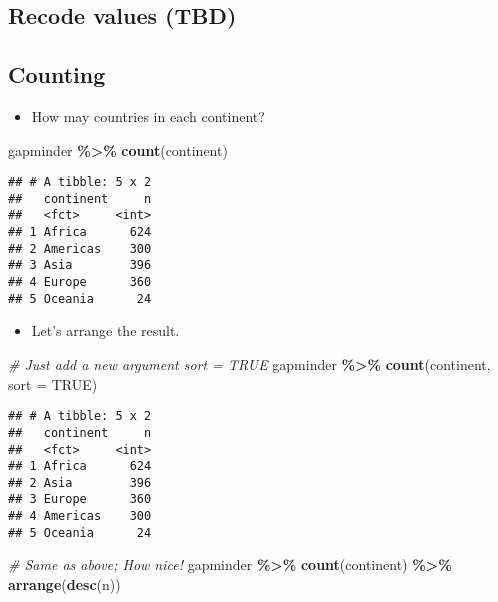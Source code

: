 \documentclass[
]{book}
\newenvironment{Shaded}{\begin{snugshade}}{\end{snugshade}}
\newcommand{\CommentTok}[1]{\textcolor[rgb]{0.56,0.35,0.01}{\textit{#1}}}
\newcommand{\DataTypeTok}[1]{\textcolor[rgb]{0.13,0.29,0.53}{#1}}
\newcommand{\KeywordTok}[1]{\textcolor[rgb]{0.13,0.29,0.53}{\textbf{#1}}}
\newcommand{\NormalTok}[1]{#1}
\newcommand{\OperatorTok}[1]{\textcolor[rgb]{0.81,0.36,0.00}{\textbf{#1}}}
\newcommand{\OtherTok}[1]{\textcolor[rgb]{0.56,0.35,0.01}{#1}}
\newcommand{\StringTok}[1]{\textcolor[rgb]{0.31,0.60,0.02}{#1}}
\providecommand{\tightlist}{%
  \setlength{\itemsep}{0pt}\setlength{\parskip}{0pt}}
\begin{document}
\hypertarget{recode-values-tbd}{%
\subsection{Recode values (TBD)}\label{recode-values-tbd}}

\hypertarget{counting}{%
\subsection{Counting}\label{counting}}

\begin{itemize}
\tightlist
\item
  How may countries in each continent?
\end{itemize}

\begin{Shaded}
\begin{Highlighting}[]
\NormalTok{gapminder }\OperatorTok{\%\textgreater{}\%}
\StringTok{  }\KeywordTok{count}\NormalTok{(continent)}
\end{Highlighting}
\end{Shaded}

\begin{verbatim}
## # A tibble: 5 x 2
##   continent     n
##   <fct>     <int>
## 1 Africa      624
## 2 Americas    300
## 3 Asia        396
## 4 Europe      360
## 5 Oceania      24
\end{verbatim}

\begin{itemize}
\tightlist
\item
  Let's arrange the result.
\end{itemize}

\begin{Shaded}
\begin{Highlighting}[]
\CommentTok{\# Just add a new argument \textasciigrave{}sort = TRUE\textasciigrave{}}
\NormalTok{gapminder }\OperatorTok{\%\textgreater{}\%}
\StringTok{  }\KeywordTok{count}\NormalTok{(continent, }\DataTypeTok{sort =} \OtherTok{TRUE}\NormalTok{)}
\end{Highlighting}
\end{Shaded}

\begin{verbatim}
## # A tibble: 5 x 2
##   continent     n
##   <fct>     <int>
## 1 Africa      624
## 2 Asia        396
## 3 Europe      360
## 4 Americas    300
## 5 Oceania      24
\end{verbatim}

\begin{Shaded}
\begin{Highlighting}[]
\CommentTok{\# Same as above; How nice!}
\NormalTok{gapminder }\OperatorTok{\%\textgreater{}\%}
\StringTok{  }\KeywordTok{count}\NormalTok{(continent) }\OperatorTok{\%\textgreater{}\%}
\StringTok{  }\KeywordTok{arrange}\NormalTok{(}\KeywordTok{desc}\NormalTok{(n))}
\end{Highlighting}
\end{Shaded}
\end{document}
